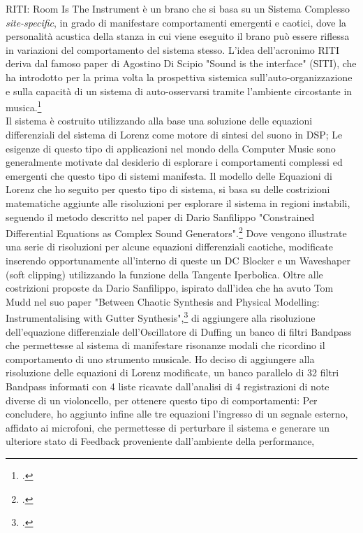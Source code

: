 RITI: Room Is The Instrument è un brano che si basa su un Sistema Complesso \textit{site-specific},
in grado di manifestare comportamenti emergenti e caotici,
dove la personalità acustica della stanza in cui viene eseguito il brano può
essere riflessa in variazioni del comportamento del sistema stesso.
L'idea dell'acronimo RITI deriva dal famoso paper di Agostino Di Scipio 
"Sound is the interface" (SITI), 
che ha introdotto per la prima volta la prospettiva sistemica 
sull'auto-organizzazione e sulla capacità di un sistema di auto-osservarsi 
tramite l'ambiente circostante in musica.\footcite{di_scipio_sound_2003} \\
Il sistema è costruito utilizzando alla base una soluzione 
delle equazioni differenziali del sistema di Lorenz come motore di sintesi del suono in DSP;
Le esigenze di questo tipo di applicazioni nel mondo della Computer Music
sono generalmente motivate dal desiderio di esplorare i comportamenti complessi ed emergenti
che questo tipo di sistemi manifesta.
Il modello delle Equazioni di Lorenz che ho seguito per questo tipo di sistema, si basa
su delle costrizioni matematiche aggiunte alle risoluzioni
per esplorare il sistema in regioni instabili, 
seguendo il metodo descritto nel paper di Dario Sanfilippo 
"Constrained Differential Equations as Complex Sound Generators".\footcite{sanfilippo_constrained_2021} 
Dove vengono illustrate una serie di risoluzioni per alcune 
equazioni differenziali caotiche,
modificate inserendo opportunamente all'interno di queste un
DC Blocker e un Waveshaper (soft clipping) utilizzando la funzione della Tangente Iperbolica.
Oltre alle costrizioni proposte da Dario Sanfilippo, 
ispirato dall'idea che ha avuto Tom Mudd nel suo paper
"Between Chaotic Synthesis and Physical Modelling: Instrumentalising with Gutter Synthesis",\footcite{tom_mudd_gutter_synthesis}
di aggiungere alla risoluzione dell'equazione differenziale dell'Oscillatore di Duffing
un banco di filtri Bandpass che permettesse al sistema di manifestare
risonanze modali che ricordino il comportamento di uno strumento musicale.
Ho deciso di aggiungere alla risoluzione delle equazioni di Lorenz modificate,
un banco parallelo di 32 filtri Bandpass informati 
con 4 liste ricavate dall'analisi di 4 registrazioni di note diverse di un violoncello, 
per ottenere questo tipo di comportamenti:
Per concludere, ho aggiunto infine alle tre equazioni l'ingresso di un segnale esterno, affidato ai microfoni, 
che permettesse di perturbare il sistema e generare un ulteriore stato 
di Feedback proveniente dall'ambiente della performance,

